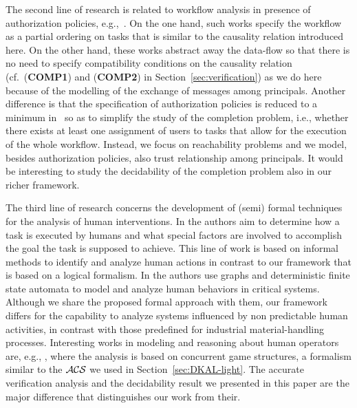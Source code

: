 \documentclass[conference]{llncs}
\newcommand{\acs}{\ensuremath \mathcal{ACS}}
\begin{document}
{The second line of research is related to workflow analysis in
presence of authorization policies, e.g.,~\cite{pacibertino,crampton}.
On the one hand, such works specify the workflow as a partial ordering
on tasks that is similar to the causality relation introduced here.
On the other hand, these works abstract away the data-flow so that
there is no need to specify compatibility conditions on the causality
relation (cf.~(\textbf{COMP1}) and (\textbf{COMP2}) in
Section~\ref{sec:verification}) as we do here because of the modelling
of the exchange of messages among principals.  Another difference is
that the specification of authorization policies is reduced to a
minimum in~\cite{pacibertino,crampton} so as to simplify the study of
the completion problem, i.e., whether there exists at least one
assignment of users to tasks that allow for the execution of the whole
workflow.  Instead, we focus on reachability problems and we model,
besides authorization policies, also trust relationship among
principals.  It would be interesting to study the decidability of the
completion problem also in our richer framework.  

The third line of research concerns the development of (semi) formal techniques
for the analysis of human interventions.
In \cite{diaper90,suokas85} the authors aim to determine how a task is executed by
humans and what special factors are involved to accomplish the goal
the task is supposed to achieve. This line of work is based on informal methods 
to identify and analyze human actions in contrast to our framework that is based
on a logical formalism. 
In \cite{shin06} the authors use graphs and deterministic finite state automata
to model and analyze human behaviors in critical systems.
Although we share the proposed formal approach with them, our framework differs for the capability to analyze systems influenced by non predictable human activities, 
in contrast with those predefined for industrial material-handling processes.
Interesting works in modeling and reasoning about human operators 
are, e.g., \cite{yasmeen11,gunter09}, where the analysis is based on concurrent game structures, a formalism similar to the $\acs$ we used in Section~\ref{sec:DKAL-light}.
The accurate verification analysis and the decidability result we presented in this paper 
are the major difference that distinguishes our work from their.








}
\end{document}

